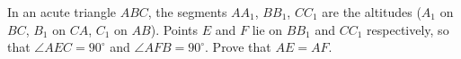 In an acute triangle $ABC$, the segments $AA_1$, $BB_1$, $CC_1$ are the altitudes ($A_1$ on $BC$, $B_1$ on $CA$, $C_1$ on $AB$). Points $E$ and $F$ lie on $BB_1$ and $CC_1$ respectively, so that $\angle AEC=90^\circ$ and $\angle AFB=90^\circ$. Prove that $AE=AF$.

